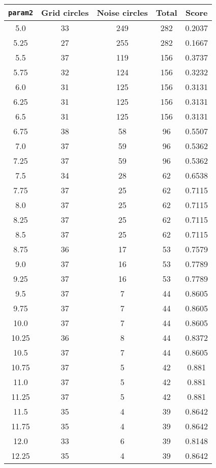 \documentclass[letterpaper, 12pt]{article}
\begin{document}
\begin{longtable}{|c|c|c|c|c|}
\hline
\textbf{\texttt{param2}} & \textbf{Grid circles} & \textbf{Noise circles} & \textbf{Total} & \textbf{Score} \\
\hline
5.0 & 33 & 249 & 282 & 0.2037 \\
\hline
5.25 & 27 & 255 & 282 & 0.1667 \\
\hline
5.5 & 37 & 119 & 156 & 0.3737 \\
\hline
5.75 & 32 & 124 & 156 & 0.3232 \\
\hline
6.0 & 31 & 125 & 156 & 0.3131 \\
\hline
6.25 & 31 & 125 & 156 & 0.3131 \\
\hline
6.5 & 31 & 125 & 156 & 0.3131 \\
\hline
6.75 & 38 & 58 & 96 & 0.5507 \\
\hline
7.0 & 37 & 59 & 96 & 0.5362 \\
\hline
7.25 & 37 & 59 & 96 & 0.5362 \\
\hline
7.5 & 34 & 28 & 62 & 0.6538 \\
\hline
7.75 & 37 & 25 & 62 & 0.7115 \\
\hline
8.0 & 37 & 25 & 62 & 0.7115 \\
\hline
8.25 & 37 & 25 & 62 & 0.7115 \\
\hline
8.5 & 37 & 25 & 62 & 0.7115 \\
\hline
8.75 & 36 & 17 & 53 & 0.7579 \\
\hline
9.0 & 37 & 16 & 53 & 0.7789 \\
\hline
9.25 & 37 & 16 & 53 & 0.7789 \\
\hline
9.5 & 37 & 7 & 44 & 0.8605 \\
\hline
9.75 & 37 & 7 & 44 & 0.8605 \\
\hline
10.0 & 37 & 7 & 44 & 0.8605 \\
\hline
10.25 & 36 & 8 & 44 & 0.8372 \\
\hline
10.5 & 37 & 7 & 44 & 0.8605 \\
\hline
10.75 & 37 & 5 & 42 & 0.881 \\
\hline
11.0 & 37 & 5 & 42 & 0.881 \\
\hline
11.25 & 37 & 5 & 42 & 0.881 \\
\hline
11.5 & 35 & 4 & 39 & 0.8642 \\
\hline
11.75 & 35 & 4 & 39 & 0.8642 \\
\hline
12.0 & 33 & 6 & 39 & 0.8148 \\
\hline
12.25 & 35 & 4 & 39 & 0.8642 \\
\hline

\end{longtable}
\end{document}
